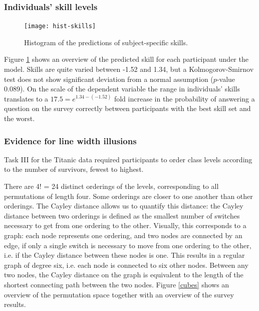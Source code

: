 \subsubsection*{Individuals' skill levels}
\begin{figure}
\centering \texttt{[image: hist-skills]}
\caption{\label{skills}Histogram of the predictions of subject-specific skills. }
\vspace{-0.2in}
\end{figure}	
Figure \ref{skills} shows an overview of the predicted skill for each participant under the model. Skills are quite varied between  -1.52 and  1.34, but
a Kolmogorov-Smirnov test  does not show significant deviation from a normal assumption ($p$-value 0.089).
On the scale of the dependent variable the range in individuals' skills translates to a $17.5 = e^{1.34 - (-1.52)}$ fold increase in the probability of answering a question on the survey correctly between participants with the best skill set and the worst.


\subsubsection*{Evidence for line width illusions}

Task III for the Titanic data required participants to order  class levels  according to the number of survivors, fewest to highest. 




There are 4! = 24 distinct orderings of the levels, corresponding to all permutations of length four. Some orderings are closer to one another than other orderings. 
The Cayley distance allows us to quantify this distance: the Cayley distance between two orderings is defined as the smallest number of switches necessary to get from one ordering to the other. Visually, this corresponds to a graph: each node represents one ordering, and two nodes are connected by an edge, if only a single switch is necessary to move from one ordering to the other, i.e. if the Cayley distance between these nodes is one.
This results  in a  regular graph of degree six, i.e. each  node is connected to six other nodes. Between any two nodes, the Cayley distance on the graph is equivalent to the length of the shortest connecting path between the two nodes.
Figure \ref{cubes} shows an overview of the permutation space together with an overview of the survey results. 

